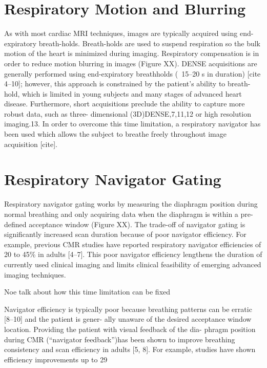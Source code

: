 \section{Respiratory Motion and Blurring}
	As with most cardiac MRI techniques, images are typically acquired using end-expiratory breath-holds. Breath-holds are used to suspend respiration so the bulk motion of the heart is minimized during imaging. Respiratory compensation is  in order to reduce motion blurring in images (Figure XX). DENSE acquisitions are generally performed using end-expiratory breathholds (~15–20 s in duration) [cite 4–10]; however, this approach is constrained by the patient’s ability to breath- hold, which is limited in young subjects and many stages of advanced heart disease. Furthermore, short acquisitions preclude the ability to capture more robust data, such as three- dimensional (3D)DENSE,7,11,12 or high resolution imaging.13. In order to overcome this time limitation, a respiratory navigator has been used which allows the subject to breathe freely throughout image acquisition [cite].

\section{Respiratory Navigator Gating}
	Respiratory navigator gating works by measuring the diaphragm position during normal breathing and only acquiring data when the diaphragm is within a pre-defined acceptance window (Figure XX). The trade-off of navigator gating is significantly increased scan duration because of poor navigator efficiency. For example, previous CMR studies have reported respiratory navigator efficiencies of 20 to 45\% in adults [4–7]. This poor navigator efficiency lengthens the duration of currently used clinical imaging and limits clinical feasibility of emerging advanced imaging techniques.
	
	Noe talk about how this time limitation can be fixed
	
	Navigator efficiency is typically poor because breathing patterns can be erratic [8–10] and the patient is gener- ally unaware of the desired acceptance window location. Providing the patient with visual feedback of the dia- phragm position during CMR (“navigator feedback”)has been shown to improve breathing consistency and scan efficiency in adults [5, 8]. For example, studies have shown efficiency improvements up to 29 %
	
